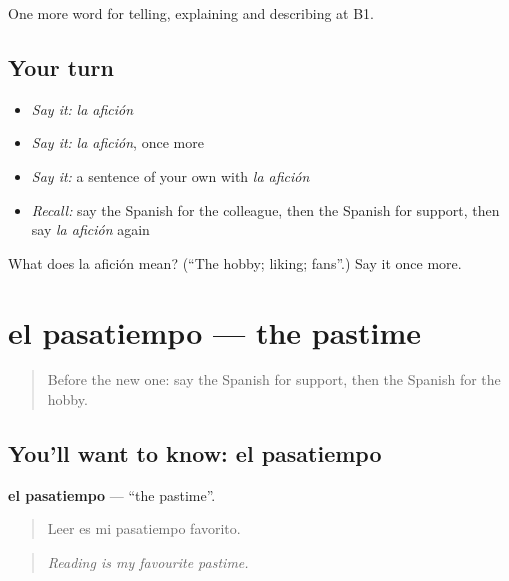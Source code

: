 \begin{grammarlens}[title={What you've built}]
One more word for telling, explaining and describing at B1.
\end{grammarlens}

\subsection*{Your turn}
\begin{itemize}
\raggedright
  \item \emph{Say it:} \emph{la afición}
  \item \emph{Say it:} \emph{la afición}, once more
  \item \emph{Say it:} a sentence of your own with \emph{la afición}
  \item \emph{Recall:} say the Spanish for the colleague, then the Spanish for support, then say \emph{la afición} again
\end{itemize}

\begin{tcolorbox}[breakable,colback=teal!4,colframe=teal!35!black,title={Before you move on}]
What does la afición mean? (\textquotedblleft{}The hobby; liking; fans\textquotedblright{}.) Say it once more.
\end{tcolorbox}
\section[el pasatiempo]{el pasatiempo — the pastime}

\label{lesson:ES-C751-pasatiempo}



\begin{quote}
Before the new one: say the Spanish for support, then the Spanish for the hobby.
\end{quote}

\subsection*{You'll want to know: el pasatiempo}
\textbf{el pasatiempo} — \textquotedblleft{}the pastime\textquotedblright{}.

\begin{quote}
Leer es mi pasatiempo favorito.
\end{quote}

\begin{quote}
\emph{Reading is my favourite pastime.}
\end{quote}

